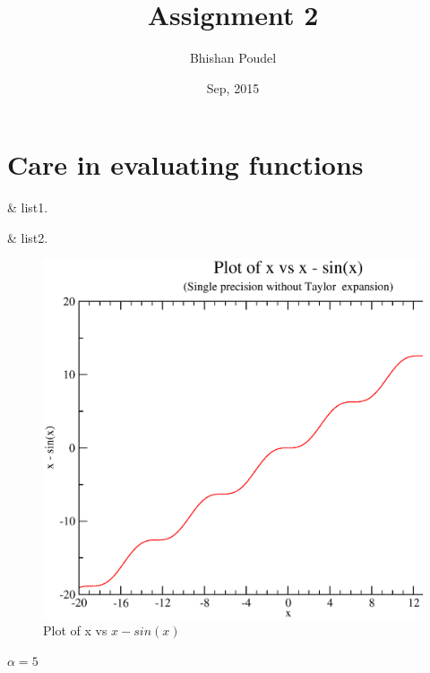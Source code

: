 \documentclass[11pt,a4paper,english]{article}
\title{Assignment 2}
\author{Bhishan Poudel}
\date{Sep, 2015}
\begin{document}
\maketitle
\tableofcontents
\listoffigures

\section{Care in evaluating functions}



	\begin{easylist}
	& 	list1.

	& 	list2.

	\end{easylist}

	\begin{figure}
	\centering
	\includegraphics[width=1.0\textwidth,left]{./images/ass2qn1Single.eps}
	\caption{Plot of x vs $x - sin(x)$ }
	\end{figure}

	$\alpha = 5$
\end{document}
